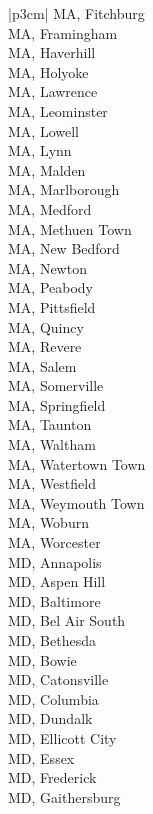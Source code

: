 \begin{customLongTable}{ |p{3cm}| }
MA, Fitchburg \\ \hline
MA, Framingham \\ \hline
MA, Haverhill \\ \hline
MA, Holyoke \\ \hline
MA, Lawrence \\ \hline
MA, Leominster \\ \hline
MA, Lowell \\ \hline
MA, Lynn \\ \hline
MA, Malden \\ \hline
MA, Marlborough \\ \hline
MA, Medford \\ \hline
MA, Methuen Town \\ \hline
MA, New Bedford \\ \hline
MA, Newton \\ \hline
MA, Peabody \\ \hline
MA, Pittsfield \\ \hline
MA, Quincy \\ \hline
MA, Revere \\ \hline
MA, Salem \\ \hline
MA, Somerville \\ \hline
MA, Springfield \\ \hline
MA, Taunton \\ \hline
MA, Waltham \\ \hline
MA, Watertown Town \\ \hline
MA, Westfield \\ \hline
MA, Weymouth Town \\ \hline
MA, Woburn \\ \hline
MA, Worcester \\ \hline
MD, Annapolis \\ \hline
MD, Aspen Hill \\ \hline
MD, Baltimore \\ \hline
MD, Bel Air South \\ \hline
MD, Bethesda \\ \hline
MD, Bowie \\ \hline
MD, Catonsville \\ \hline
MD, Columbia \\ \hline
MD, Dundalk \\ \hline
MD, Ellicott City \\ \hline
MD, Essex \\ \hline
MD, Frederick \\ \hline
MD, Gaithersburg \\ \hline

\end{customLongTable}
